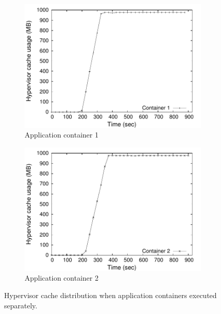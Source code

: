 \begin{figure}
\centering
\begin{subfigure}{0.49\columnwidth} 
\includegraphics[width=\columnwidth]{data/motivation/disparity_c1} 
 \caption{Application container 1}
 \label{fig:cachedistrib1} 
\end{subfigure} \hfill
%
\begin{subfigure}{0.49\columnwidth}
\includegraphics[width=\columnwidth]{data/motivation/disparity_c2} 
 \caption{Application container 2}
 \label{fig:cachedistrib2} 
\end{subfigure} \hfill
%
\caption{Hypervisor cache distribution when application containers
         executed separately.}
\vspace{-0.3cm}
\label{fig:separate}
\end{figure}


